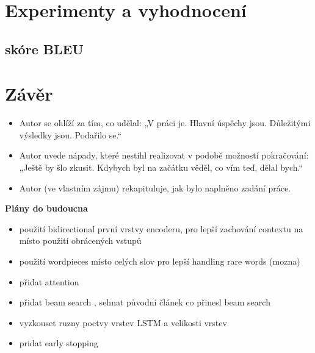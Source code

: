 \chapter{Experimenty a vyhodnocení}
\section{skóre BLEU}



\chapter{Závěr}
\begin{itemize}
  \item Autor se ohlíží za tím, co udělal: „V práci je. Hlavní úspěchy jsou. Důležitými výsledky jsou. Podařilo se.“
  \item Autor uvede nápady, které nestihl realizovat v podobě možností pokračování: „Ještě by šlo zkusit. Kdybych byl na začátku věděl, co vím teď, dělal bych.“
  \item Autor (ve vlastním zájmu) rekapituluje, jak bylo naplněno zadání práce.
\end{itemize}

\textbf{Plány do budoucna}
\begin{itemize}
    \item použití bidirectional první vrstvy encoderu, pro lepší zachování contextu \cite{googleBridgingGap} na místo použití obrácených vstupů
    \item použití wordpieces \cite{googleBridgingGap} místo celých slov pro lepší handling rare words (mozna)
    \item přidat attention \cite{attention}
    \item přidat beam search \cite{nmtTutorial}, sehnat původní článek co přinesl beam search
    \item vyzkouset ruzny poctvy vrstev LSTM a velikosti vrstev
    \item pridat early stopping
\end{itemize}
